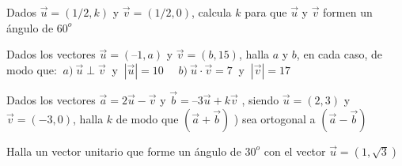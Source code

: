 \begin{mipropuesto}

Dados $\vec u=(1/2,k)$ y $\vec v=(1/2,0)$, calcula $k$ para que $\vec u$ y $\vec v$ formen un ángulo de $60^o$	
\end{mipropuesto}

\vspace{-8mm}
\begin{flushright}
\begin{footnotesize} \textcolor{gris}{}	\end{footnotesize}
\end{flushright}


\begin{mipropuesto}

Dados los vectores $\vec u= (–1, a)$ y $\vec v= (b, 15)$, halla $a$ y $b$, en cada caso, de modo que: $\ a)\  \vec u \perp  \vec v \ $  y $\ |\vec u| = 10$ $\quad b)\  \vec u \cdot  \vec v = 7 \ $ y $\ |\vec  v | = 17$	
\end{mipropuesto}

\vspace{-8mm}
\begin{flushright}
\begin{footnotesize} \textcolor{gris}{}	\end{footnotesize}
\end{flushright}


\begin{mipropuesto}

Dados los vectores $\vec a = 2 \vec u - \vec v$ y $\vec b = –3 \vec u + k \vec v$ , siendo $\vec u = (2, 3)$ y $\vec v = (-3, 0)$, halla $k$ de modo que $(\vec a + \vec b)$ ) sea ortogonal a $(\vec a - \vec b)$	
\end{mipropuesto}

\vspace{-8mm}
\begin{flushright}
\begin{footnotesize} \textcolor{gris}{}	\end{footnotesize}
\end{flushright}


\begin{mipropuesto}

Halla un vector unitario que forme un ángulo de $30^o$ con el vector $\vec u= (1, \sqrt{3} )$
	
\end{mipropuesto}

